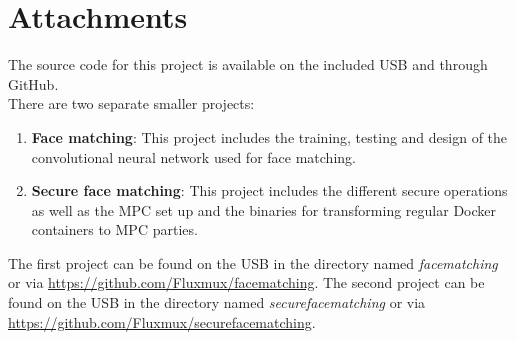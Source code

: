 \chapter{Attachments}
The source code for this project is available on the included USB and through GitHub.\\

There are two separate smaller projects:
\begin{enumerate}
  \item \textbf{Face matching}: This project includes the training, testing and design of the convolutional neural network used for face matching.
  \item \textbf{Secure face matching}: This project includes the different secure operations as well as the MPC set up and the binaries for transforming regular Docker containers to MPC parties.
\end{enumerate}

The first project can be found on the USB in the directory named \textit{facematching} or via \url{https://github.com/Fluxmux/facematching}. The second project can be found on the USB in the directory named \textit{securefacematching} or via \url{https://github.com/Fluxmux/securefacematching}.
